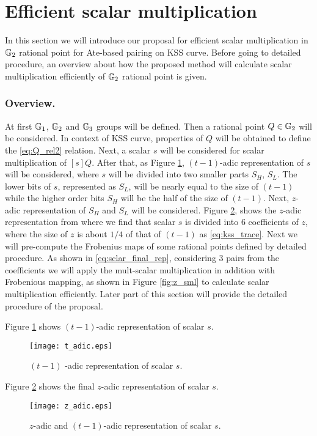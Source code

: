 \section{Efficient scalar multiplication}
In this section we will introduce our proposal for efficient scalar multiplication in ${\mathbb{G}}_{2}$ rational point for Ate-based pairing on KSS curve. 
Before going to detailed procedure, an overview about how the proposed method will calculate scalar multiplication efficiently of ${\mathbb{G}}_{2}$ rational point is given.
\subsubsection{Overview.} At first ${\mathbb{G}}_{1}$, ${\mathbb{G}}_{2}$ and ${\mathbb{G}}_{3}$ groups will be defined. Then a rational point $Q \in {\mathbb{G}}_{2}$ will be considered. In context of KSS curve, properties of $Q$ will be obtained to define the \eqref{eq:Q_rel2} relation. Next, a scalar $s$ will be considered for scalar multiplication of $[s]Q$. After that, as Figure \ref{fig:t_adic}, $(t-1)$-adic representation of $s$ will be considered, where $s$ will be divided into two smaller parts $S_H$, $S_L$. The lower bits of $s$, represented as $S_L$, will be nearly equal to the size of $(t-1)$ while the higher order bits $S_H$ will be the half of the size of $(t-1)$. Next, $z$-adic representation of $S_H$ and $S_L$ will be considered. Figure \ref{fig:z_adicl}, shows the $z$-adic representation from where we find that scalar $s$ is divided into 6 coefficients of $z$, where the size of $z$ is about $1/4$ of that of $(t-1)$ as \eqref{eq:kss_trace}. Next we will pre-compute the Frobenius maps of some rational points defined by detailed procedure. As shown in \eqref{eq:sclar_final_rep}, considering 3 pairs   from the coefficients we will apply the mult-scalar multiplication in addition with Frobenious mapping, as shown in Figure \ref{fig:z_sml} to calculate scalar multiplication efficiently. Later part of this section will provide the detailed procedure of the proposal.

Figure \ref{fig:t_adic} shows $(t-1)$-adic representation of scalar $s$. 
\begin{figure}[!ht]
\centering
\texttt{[image: t\_adic.eps]}
\caption{$(t-1)$ -adic representation of scalar $s$.}
\label{fig:t_adic}
\end{figure}

Figure \ref{fig:z_adicl} shows the final $z$-adic representation of scalar $s$. 
\begin{figure}[!ht]
\centering
\texttt{[image: z\_adic.eps]}
\caption{$z$-adic and $(t-1)$-adic representation of scalar $s$.}
\label{fig:z_adicl}
\end{figure}

